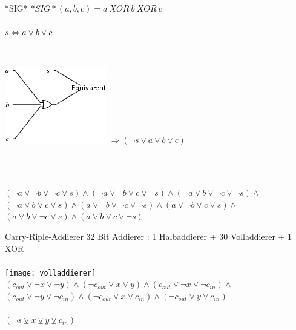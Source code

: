 \documentclass{beamer}
\begin{document}
    \begin{frame}{*SIG*}
      $ *SIG*(a, b, c) = a~XOR~b~XOR~c $\\
      ~\\
      $ s \Leftrightarrow a \veebar b \veebar c $\\
      ~\\      
      \begin{columns}[C]
        \includegraphics[scale=0.5]{sig.png}
        $ \Rightarrow (\neg s \veebar a \veebar b \veebar c) $
      \end{columns}
      ~\\
      ~\\
      $ (\neg a \vee \neg b \vee \neg c \vee s) \wedge (\neg a \vee \neg b \vee c \vee \neg s) \wedge (\neg a \vee b \vee \neg c \vee \neg s) \wedge$\\
      $ (\neg a \vee b \vee c \vee s) \wedge (a \vee \neg b \vee \neg c \vee \neg s) \wedge (a \vee \neg b \vee c \vee s) \wedge $\\
      $ (a \vee b \vee \neg c \vee s) \wedge (a \vee b \vee c \vee \neg s) $
    \end{frame}
    \begin{frame}{Carry-Riple-Addierer}
      32 Bit Addierer : 1 Halbaddierer + 30 Volladdierer + 1 XOR\\
      ~\\
      \texttt{[image: volladdierer]}\\
      $ (c_{out} \vee \neg x \vee \neg y) \wedge (\neg c_{out} \vee x \vee y) \wedge (c_{out} \vee \neg x \vee \neg c_{in}) \wedge $\\
      $ (c_{out} \vee \neg y \vee \neg c_{in}) \wedge (\neg c_{out} \vee x \vee c_{in}) \wedge (\neg c_{out} \vee y \vee c_{in}) $\\
      ~\\
      $ (\neg s \veebar x \veebar y \veebar c_{in})$\\
    \end{frame}
\end{document}

